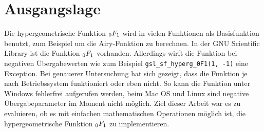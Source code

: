 %
%
%
\section{Ausgangslage\label{0f1:section:ausgangslage}}
Die hypergeometrische Funktion $\mathstrut_0F_1$ wird in vielen Funktionen als Basisfunktion benutzt, 
zum Beispiel um die Airy-Funktion zu berechnen. 
In der GNU Scientific Library \cite{0f1:library-gsl} 
ist die Funktion $\mathstrut_0F_1$ vorhanden. 
Allerdings wirft die Funktion bei negativen Übergabewerten wie zum Beispiel \verb+gsl_sf_hyperg_0F1(1, -1)+ eine Exception. 
Bei genauerer Untersuchung hat sich gezeigt, dass die Funktion je nach Betriebssystem funktioniert oder eben nicht. 
So kann die Funktion unter Windows fehlerfrei aufgerufen werden, beim Mac OS und Linux sind negative Übergabeparameter im Moment nicht möglich.
Ziel dieser Arbeit war es zu evaluieren, ob es mit einfachen mathematischen Operationen möglich ist, die hypergeometrische Funktion $\mathstrut_0F_1$ zu implementieren.
